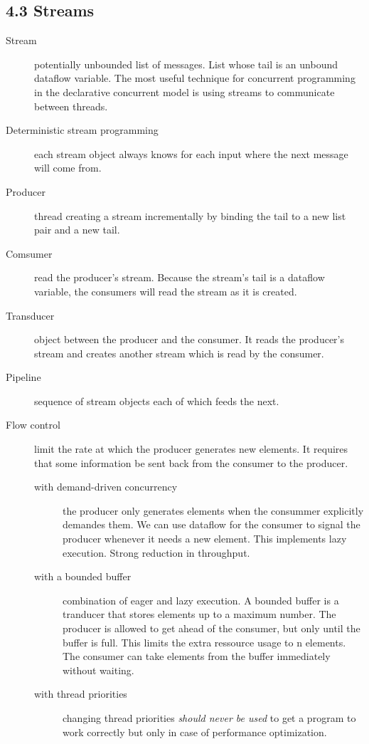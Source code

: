 \subsection{4.3 Streams}

\begin{description}
  \item[Stream] potentially unbounded list of messages.
    List whose tail is an unbound dataflow variable.
    The most useful technique for concurrent programming in the declarative concurrent model is using streams to communicate between threads.
  \item[Deterministic stream programming] each stream object always knows for each input where the next message will come from.
  \item[Producer] thread creating a stream incrementally by binding the tail to a new list pair and a new tail.
  \item[Comsumer] read the producer's stream.
    Because the stream's tail is a dataflow variable, the consumers will read the stream as it is created.
  \item[Transducer] object between the producer and the consumer.
    It reads the producer's stream and creates another stream which is read by the consumer.
  \item[Pipeline] sequence of stream objects each of which feeds the next.
  \item[Flow control] limit the rate at which the producer generates new elements.
    It requires that some information be sent back from the consumer to the producer.
    \begin{description}
      \item[with demand-driven concurrency] the producer only generates elements when the consummer explicitly demandes them.
        We can use dataflow for the consumer to signal the producer whenever it needs a new element.
        This implements lazy execution.
        Strong reduction in throughput.
      \item[with a bounded buffer] combination of eager and lazy execution.
        A bounded buffer is a tranducer that stores elements up to a maximum number.
        The producer is allowed to get ahead of the consumer, but only until the buffer is full.
        This limits the extra ressource usage to n elements.
        The consumer can take elements from the buffer immediately without waiting.
      \item[with thread priorities] changing thread priorities \emph{should never be used} to get a program to work correctly but only in case of performance optimization.
    \end{description}


\end{description}
